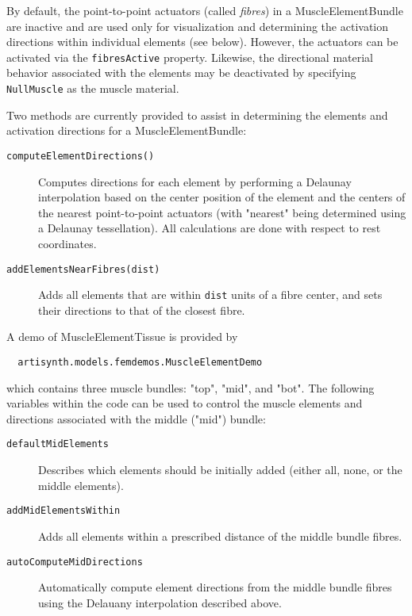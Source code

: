 \documentclass{article}
\begin{document}
By default, the point-to-point actuators (called {\it fibres}) in a
MuscleElementBundle are inactive and are used only for visualization
and determining the activation directions within individual elements
(see below).  However, the actuators can be activated via the
{\tt fibresActive} property. Likewise, the directional material behavior
associated with the elements may be deactivated by specifying
{\tt NullMuscle} as the muscle material.

Two methods are currently provided to assist in determining the
elements and activation directions for a MuscleElementBundle:

\begin{description}

\item[{\tt computeElementDirections()}]  \mbox{}
Computes directions for each element by performing a Delaunay
interpolation based on the center position of the element and the
centers of the nearest point-to-point actuators (with "nearest" being
determined using a Delaunay tessellation). All calculations are done
with respect to rest coordinates.

\item[{\tt addElementsNearFibres(dist)}] \mbox{}
Adds all elements that are within {\tt dist} units of a fibre center, and
sets their directions to that of the closest fibre.

\end{description}

A demo of MuscleElementTissue is provided by

\begin{verbatim}
  artisynth.models.femdemos.MuscleElementDemo
\end{verbatim}

which contains three muscle bundles: "top", "mid", and "bot". The
following variables within the code can be used to control the muscle
elements and directions associated with the middle ("mid") bundle:

\begin{description}

\item[{\tt defaultMidElements}]  \mbox{}
Describes which elements should be initially added (either
all, none, or the middle elements).

\item[{\tt addMidElementsWithin}] \mbox{}
Adds all elements within a prescribed distance of the middle bundle
fibres.

\item[{\tt autoComputeMidDirections}] \mbox{}
Automatically compute element directions from the middle bundle fibres
using the Delauany interpolation described above.

\end{description}
\end{document}
